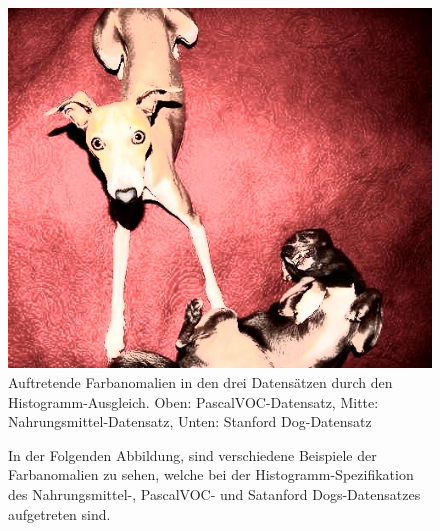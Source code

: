 \begin{appendices}
\begin{figure}[htb]
\begin{minipage}{0.19\textwidth}
\includegraphics[width=\textwidth]{images/anomalien/HA/n02091032_12113.jpg}
\end{minipage}
\caption{Auftretende Farbanomalien in den drei Datensätzen durch den Histogramm-Ausgleich. Oben: PascalVOC-Datensatz, Mitte: Nahrungsmittel-Datensatz, Unten: Stanford Dog-Datensatz}
\label{img:anoHA}
\end{figure}
\newpage 
\begin{figure}[htb]
\center
\begin{minipage}{\textwidth}
In der Folgenden Abbildung, sind verschiedene Beispiele der Farbanomalien zu sehen, welche bei der Histogramm-Spezifikation des Nahrungsmittel-, PascalVOC- und Satanford Dogs-Datensatzes aufgetreten sind.
\end{minipage}
\begin{minipage}{\textwidth}
\hspace{\textwidth}
\end{minipage}
\begin{minipage}{0.19\textwidth}

\end{minipage}
\end{figure}
\end{appendices}
